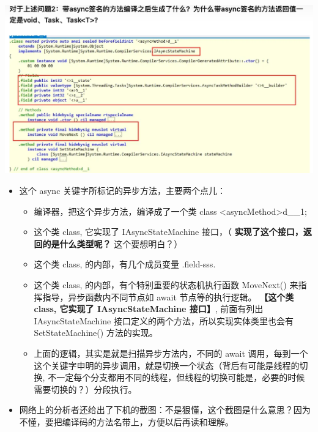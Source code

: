\documentclass[9pt, b5paper]{article}
\begin{document}
\includegraphics[width=.9\linewidth]{./pic/et3_20230609_110634.png}
\begin{itemize}
\item 这个 async 关键字所标记的异步方法，主要两个点儿： 
\begin{itemize}
\item 编译器，把这个异步方法，编译成了一个类 class <asyncMethod>d\_\_1;
\item 这个类 class, 它实现了 IAsyncStateMachine 接口，（ \textbf{实现了这个接口，返回的是什么类型呢？} 这个要想明白？）
\item 这个类 class, 的内部，有几个成员变量 .field-sss.
\item 这个类 class, 的内部，有个特别重要的状态机执行函数 MoveNext() 来指挥指导，异步函数内不同节点如 await 节点等的执行逻辑。 \textbf{【这个类 class, 它实现了 IAsyncStateMachine 接口】}, 前面有列出 IAsyncStateMachine 接口定义的两个方法，所以实现实体类里也会有SetStateMachine() 方法的实现。
\item 上面的逻辑，其实是就是扫描异步方法内，不同的 await 调用，每到一个这个关键字申明的异步调用，就是切换一个状态（背后有可能是线程的切换, 不一定每个分支都用不同的线程，但线程的切换可能是，必要的时候需要切换的？）分段执行。
\end{itemize}
\item 网络上的分析者还给出了下机的截图：不是狠懂，这个截图是什么意思？因为不懂，要把编译码的方法名带上，方便以后再读和理解。
\end{itemize}
\end{document}
